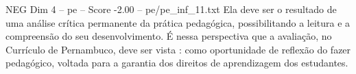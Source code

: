 \begin{textsample}{NEG Dim 4 – pe – Score -2.00 – pe/pe\_inf\_11.txt}
Ela deve ser o resultado de uma análise crítica permanente da prática pedagógica, possibilitando a leitura e a compreensão do seu desenvolvimento.
É nessa perspectiva que a avaliação, no Currículo de Pernambuco, deve ser vista : como oportunidade de reflexão do fazer pedagógico, voltada para a garantia dos direitos de aprendizagem dos estudantes.

\end{textsample}
